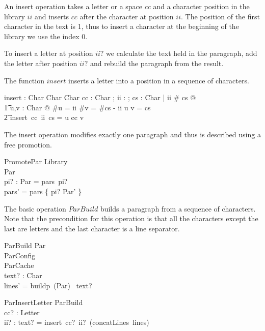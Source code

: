 \documentclass{article}
\begin{document}
An insert operation takes a letter or a space $cc$ and a character position in the library $ii$ and inserts $cc$ after the character at position $ii$. The position of the first character in the text is 1, thus to insert a character at the beginning of the library we use the index 0. 

To insert a letter at position $ii?$ we calculate the text held in the paragraph, add the letter after position $ii?$ and rebuild the paragraph from the result.

The function $insert$ inserts a letter into a position in a sequence of characters.

\begin{axdef}
	insert : Char \fun \nat \fun \seq Char \pfun \seq Char
\where
	\forall cc : Char ; ii : \nat ; cs : \seq Char | ii \leq \# cs @ \\
	\t1 \exists u,v : \seq Char @ \#u = ii \land \#v = \#cs - ii \land u \cat v = cs \land {}\\
	\t2 insert~cc~ii~cs = u \cat \langle cc \rangle \cat v 
\end{axdef}


The insert operation modifies exactly one paragraph and thus is described using a free promotion. 

\begin{schema}{PromotePar}
	\Delta Library \\
	\Delta Par \\
	pi? : \nat
\where
	\theta Par = pars~pi? \\
	pars' = pars \oplus \{ pi? \mapsto \theta Par' \}
\end{schema}

The basic operation $ParBuild$ builds a paragraph from a sequence of characters. Note that the precondition for this operation is that all the characters except the last are letters and the last character is a line separator.

\begin{schema}{ParBuild}
	\Delta Par \\
	\Xi ParConfig \\
	\Xi ParCache \\
	text? : \seq Char \\
\where
	lines' = buildp~(\theta Par) ~text? \\
\end{schema}

\begin{schema}{ParInsertLetter}
	ParBuild \\
	cc? : Letter \\
	ii? : \nat
\where
	text? = insert~cc?~ii?~(concatLines~lines) \\
\end{schema}
\end{document}
